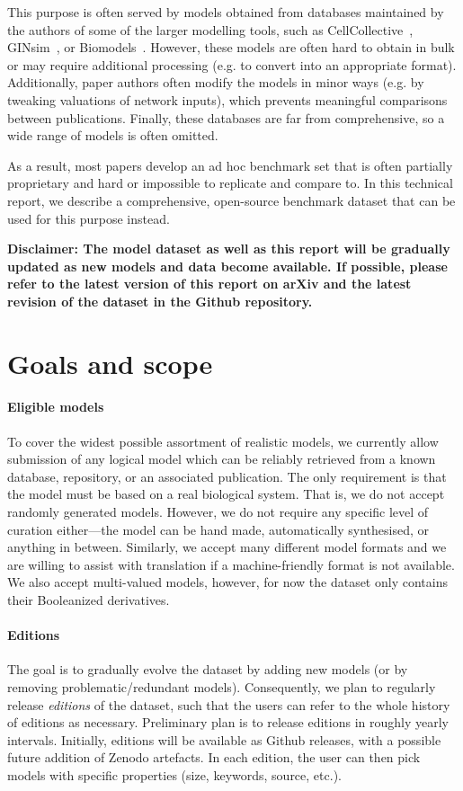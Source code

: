 \documentclass{article}
\begin{document}
This purpose is often served by models obtained from databases maintained by the authors of some of the larger modelling tools, such as CellCollective~\cite{cell-collective}, GINsim~\cite{ginsim}, or Biomodels~\cite{biomodels}. However, these models are often hard to obtain in bulk or may require additional processing (e.g. to convert into an appropriate format). Additionally, paper authors often modify the models in minor ways (e.g. by tweaking valuations of network inputs), which prevents meaningful comparisons between publications. Finally, these databases are far from comprehensive, so a wide range of models is often omitted.

As a result, most papers develop an ad hoc benchmark set that is often partially proprietary and hard or impossible to replicate and compare to. In this technical report, we describe a comprehensive, open-source benchmark dataset that can be used for this purpose instead.

\textbf{Disclaimer: The model dataset as well as this report will be gradually updated as new models and data become available. If possible, please refer to the latest version of this report on arXiv and the latest revision of the dataset in the Github repository.}

\section{Goals and scope}

\paragraph{Eligible models} To cover the widest possible assortment of realistic models, we currently allow submission of any logical model which can be reliably retrieved from a known database, repository, or an associated publication. The only requirement is that the model must be based on a real biological system. That is, we do not accept randomly generated models. However, we do not require any specific level of curation either---the model can be hand made, automatically synthesised, or anything in between. Similarly, we accept many different model formats and we are willing to assist with translation if a machine-friendly format is not available. We also accept multi-valued models, however, for now the dataset only contains their Booleanized derivatives.

\paragraph{Editions} The goal is to gradually evolve the dataset by adding new models (or by removing problematic/redundant models). Consequently, we plan to regularly release \emph{editions} of the dataset, such that the users can refer to the whole history of editions as necessary. Preliminary plan is to release editions in roughly yearly intervals. Initially, editions will be available as Github releases, with a possible future addition of Zenodo artefacts. In each edition, the user can then pick models with specific properties (size, keywords, source, etc.).
\end{document}
